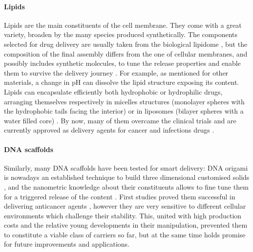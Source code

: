 \paragraph{Lipids} Lipids are the main constituents of the cell membrane. They come with a great variety, broaden by the many species produced synthetically. The components selected for drug delivery are usually taken from the biological lipidome \cite{seeRebuttal}, but the composition of the final assembly differs from the one of cellular membranes, and possibly includes synthetic molecules, to tune the release properties and enable them to survive the delivery journey \cite{Yingchoncharoen2016}. For example, as mentioned for other materials, a change in pH can dissolve the lipid structure exposing its content.
%
Lipids can encapsulate efficiently both hydrophobic or hydrophilic drugs, arranging themselves respectively in micelles structures (monolayer spheres with the hydrophobic tails facing the interior) or in liposomes (bilayer spheres with a water filled core) \cite{Bunker2016}. By now, many of them overcame the clinical trials and are currently approved as delivery agents for cancer and infections drugs \cite{Pattni2015paper, Jain2017}.

\paragraph{DNA scaffolds} Similarly, many DNA scaffolds have been tested for smart delivery: DNA origami is nowadays an established technique to build three dimensional customised solids \cite{Linko2015}, and the nanometric knowledge about their constituents allows to fine tune them for a triggered release of the content \cite{Douglas2012}. First studies proved them successful in delivering anticancer agents \cite{Zhang2014, Jiang2012}, however they are very sensitive to different cellular environments which challenge their stability. This, united with high production costs and the relative young developments in their manipulation, prevented them to constitute a viable class of carriers so far, but at the same time holds promise for future improvements and applications.

